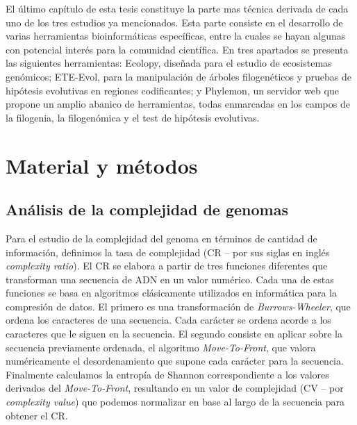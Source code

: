 El último capítulo de esta tesis constituye la parte mas técnica derivada de cada uno de los tres estudios ya mencionados. Esta parte consiste en el desarrollo de varias herramientas bioinformáticas específicas, entre la cuales se hayan algunas con potencial interés para la comunidad científica. En tres apartados se presenta las siguientes herramientas: Ecolopy, diseñada para el estudio de ecosistemas genómicos; ETE-Evol, para la manipulación de árboles filogenéticos y pruebas de hipótesis evolutivas en regiones codificantes; y Phylemon, un servidor web que propone un amplio abanico de herramientas, todas enmarcadas en los campos de la filogenia, la filogenómica y el test de hipótesis evolutivas.

\newpage
\section*{Material y métodos}

\subsection*{Análisis de la complejidad de genomas}

Para el estudio de la complejidad del genoma en términos de cantidad de información, definimos la tasa de complejidad (CR -- por sus siglas en inglés \textit{complexity ratio}). El CR se elabora a partir de tres funciones diferentes que transforman una secuencia de ADN en un valor numérico. Cada una de estas funciones se basa en algoritmos clásicamente utilizados en informática para la compresión de datos. El primero es una transformación de \textit{Burrows-Wheeler}, que ordena los caracteres de una secuencia. Cada carácter se ordena acorde a los caracteres que le siguen en la secuencia. El segundo consiste en aplicar sobre la secuencia previamente ordenada, el algoritmo \textit{Move-To-Front}, que valora numéricamente el desordenamiento que supone cada carácter para la secuencia. Finalmente calculamos la entropía de Shannon correspondiente a los valores derivados del \textit{Move-To-Front}, resultando en un valor de complejidad (CV -- por \textit{complexity value}) que podemos normalizar en base al largo de la secuencia para obtener el CR.

